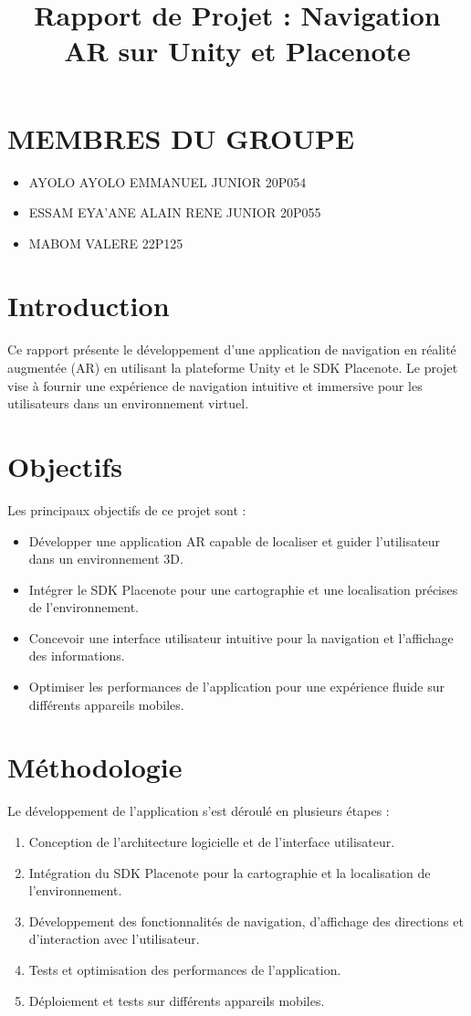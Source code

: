 \documentclass{article}
\title{Rapport de Projet : Navigation AR sur Unity et Placenote}
\begin{document}
\maketitle

\section{MEMBRES DU GROUPE}
\begin{itemize}
	\item AYOLO AYOLO EMMANUEL JUNIOR 20P054
	\item ESSAM EYA'ANE ALAIN RENE JUNIOR 20P055
	\item MABOM VALERE 22P125
\end{itemize}

\section{Introduction}
Ce rapport présente le développement d'une application de navigation en réalité augmentée (AR) en utilisant la plateforme Unity et le SDK Placenote. Le projet vise à fournir une expérience de navigation intuitive et immersive pour les utilisateurs dans un environnement virtuel.

\section{Objectifs}
Les principaux objectifs de ce projet sont :
\begin{itemize}
    \item Développer une application AR capable de localiser et guider l'utilisateur dans un environnement 3D.
    \item Intégrer le SDK Placenote pour une cartographie et une localisation précises de l'environnement.
    \item Concevoir une interface utilisateur intuitive pour la navigation et l'affichage des informations.
    \item Optimiser les performances de l'application pour une expérience fluide sur différents appareils mobiles.
\end{itemize}

\section{Méthodologie}
Le développement de l'application s'est déroulé en plusieurs étapes :
\begin{enumerate}
    \item Conception de l'architecture logicielle et de l'interface utilisateur.
    \item Intégration du SDK Placenote pour la cartographie et la localisation de l'environnement.
    \item Développement des fonctionnalités de navigation, d'affichage des directions et d'interaction avec l'utilisateur.
    \item Tests et optimisation des performances de l'application.
    \item Déploiement et tests sur différents appareils mobiles.
\end{enumerate}
\end{document}

